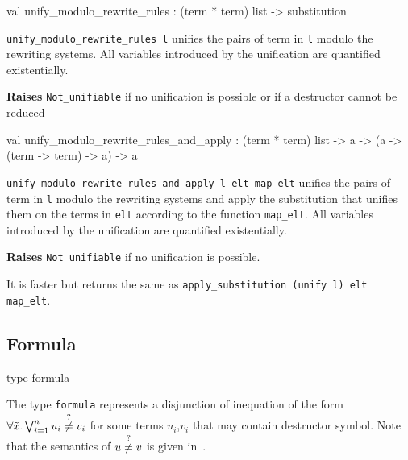 \label{val:Term.unify-underscoremodulo-underscorerewrite-underscorerules}\begin{ocamldoccode}
val unify_modulo_rewrite_rules : (term * term) list -> substitution
\end{ocamldoccode}
\begin{ocamldocdescription}
{\tt{unify\_modulo\_rewrite\_rules l}} unifies the pairs of term in {\tt{l}} modulo the rewriting systems.
    All variables introduced by the unification are quantified existentially.

{\bf Raises} {\tt{Not\_unifiable}} if no unification is possible or if a destructor cannot be reduced


\end{ocamldocdescription}




\label{val:Term.unify-underscoremodulo-underscorerewrite-underscorerules-underscoreand-underscoreapply}\begin{ocamldoccode}
val unify_modulo_rewrite_rules_and_apply :
  (term * term) list ->
  {\textquotesingle}a -> ({\textquotesingle}a -> (term -> term) -> {\textquotesingle}a) -> {\textquotesingle}a
\end{ocamldoccode}
\begin{ocamldocdescription}
{\tt{unify\_modulo\_rewrite\_rules\_and\_apply l elt map\_elt}} unifies the pairs of term in {\tt{l}} modulo the rewriting systems
    and apply the substitution that unifies them on the terms in {\tt{elt}} according to the function {\tt{map\_elt}}.
    All variables introduced by the unification are quantified existentially.

{\bf Raises} {\tt{Not\_unifiable}} if no unification is possible.


    It is faster but returns the same as {\tt{apply\_substitution (unify l) elt map\_elt}}.


\end{ocamldocdescription}




\subsection{Formula}




\label{type:Term.formula}\begin{ocamldoccode}
type formula 
\end{ocamldoccode}
\begin{ocamldocdescription}
The type {\tt{formula}} represents a disjunction of inequation of the form $\forall \tilde{x}. \bigvee_{i = 1}^n  u_i \stackrel{?}{\neq} v_i$
    for some terms $u_i$,$v_i$ that may contain destructor symbol. Note that the semantics of $u \stackrel{?}{\neq} v$ is given in~\thesis.


\end{ocamldocdescription}




